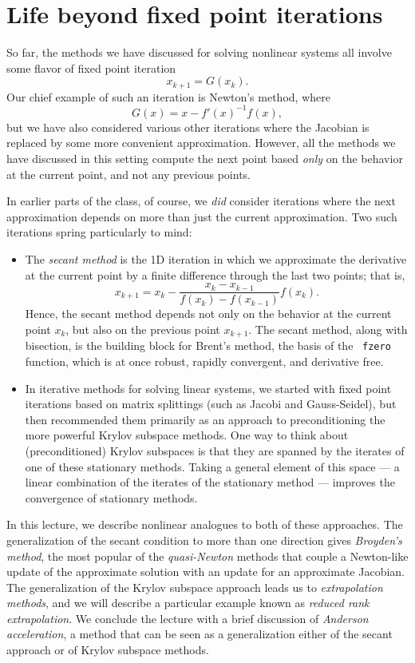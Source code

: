 \documentclass[12pt, leqno]{article} %
\begin{document}

\section{Life beyond fixed point iterations}

So far, the methods we have discussed for solving nonlinear systems
all involve some flavor of fixed point iteration
\[
  x_{k+1} = G(x_k).
\]
Our chief example of such an iteration is Newton's method, where
\[
  G(x) = x - f'(x)^{-1} f(x),
\]
but we have also considered various other iterations where the
Jacobian is replaced by some more convenient approximation.  However,
all the methods we have discussed in this setting compute the next
point based {\em only} on the behavior at the current point, and not
any previous points.

In earlier parts of the class, of course, we {\em did} consider
iterations where the next approximation depends on more than just
the current approximation.  Two such iterations spring particularly
to mind:
\begin{itemize}
\item The {\em secant method} is the 1D iteration in which we approximate
  the derivative at the current point by a finite difference through
  the last two points; that is,
  \[
    x_{k+1} = x_k - \frac{x_k-x_{k-1}}{f(x_k)-f(x_{k-1})} f(x_k).
  \]
  Hence, the secant method depends not only on the behavior at
  the current point $x_k$, but also on the previous point $x_{k+1}$.
  The secant method, along with bisection, is the building block for
  Brent's method, the basis of the \matlab\ {\tt fzero} function,
  which is at once robust, rapidly convergent, and derivative free.

\item In iterative methods for solving linear systems, we started
  with fixed point iterations based on matrix splittings (such as
  Jacobi and Gauss-Seidel), but then recommended them primarily as
  an approach to preconditioning the more powerful Krylov subspace
  methods.  One way to think about (preconditioned) Krylov subspaces
  is that they are spanned by the iterates of one of these stationary
  methods.  Taking a general element of this space --- a linear
  combination of the iterates of the stationary method --- improves
  the convergence of stationary methods.

\end{itemize}

In this lecture, we describe nonlinear analogues to both of these
approaches.  The generalization of the secant condition to more
than one direction gives {\em Broyden's method}, the most popular of
the {\em quasi-Newton} methods that couple a Newton-like update of
the approximate solution with an update for an approximate Jacobian.
The generalization of the Krylov subspace approach leads us to
{\em extrapolation methods}, and we will describe a particular example
known as {\em reduced rank extrapolation}.  We conclude the lecture
with a brief discussion of {\em Anderson acceleration}, a method that
can be seen as a generalization either of the secant approach or
of Krylov subspace methods.
\end{document}
